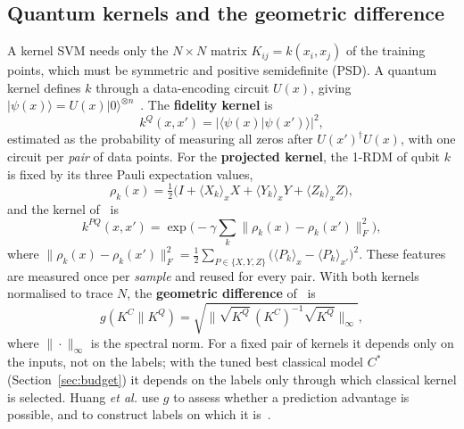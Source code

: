 \documentclass[conference]{IEEEtran}
\begin{document}
\subsection{Quantum kernels and the geometric difference}
A kernel SVM needs only the $N\times N$ matrix $K_{ij}=k(x_i,x_j)$ of the training points, which must be symmetric and positive semidefinite (PSD). A quantum kernel defines $k$ through a data-encoding circuit $U(x)$, giving $|\psi(x)\rangle=U(x)|0\rangle^{\otimes n}$~\cite{schuld2019,havlicek2019}. The \textbf{fidelity kernel} is
\begin{equation}
k^{Q}(x,x') = |\langle \psi(x)|\psi(x')\rangle|^{2},
\end{equation}
estimated as the probability of measuring all zeros after $U(x')^\dagger U(x)$, with one circuit per \emph{pair} of data points. For the \textbf{projected kernel}, the 1-RDM of qubit $k$ is fixed by its three Pauli expectation values,
\begin{equation}
\rho_k(x)=\tfrac{1}{2}\big(I+\langle X_k\rangle_x X+\langle Y_k\rangle_x Y+\langle Z_k\rangle_x Z\big),
\end{equation}
and the kernel of~\cite{huang2021} is
\begin{equation}
k^{PQ}(x,x') = \exp\!\Big(-\gamma \sum_{k}\big\|\rho_k(x)-\rho_k(x')\big\|_F^{2}\Big),
\end{equation}
where $\|\rho_k(x)-\rho_k(x')\|_F^2=\tfrac{1}{2}\sum_{P\in\{X,Y,Z\}}\big(\langle P_k\rangle_x-\langle P_k\rangle_{x'}\big)^2$. These features are measured once per \emph{sample} and reused for every pair. With both kernels normalised to trace $N$, the \textbf{geometric difference} of~\cite{huang2021} is
\begin{equation}
g(K^{C}\|K^{Q})=\sqrt{\Big\|\sqrt{K^{Q}}\,(K^{C})^{-1}\sqrt{K^{Q}}\Big\|_{\infty}},
\end{equation}
where $\|\cdot\|_\infty$ is the spectral norm. For a fixed pair of kernels it depends only on the inputs, not on the labels; with the tuned best classical model $C^\ast$ (Section~\ref{sec:budget}) it depends on the labels only through which classical kernel is selected. Huang \textit{et al.} use $g$ to assess whether a prediction advantage is possible, and to construct labels on which it is~\cite{huang2021}.
\end{document}
